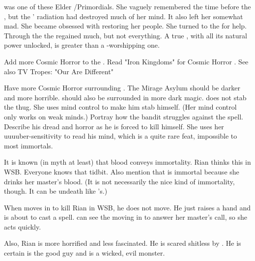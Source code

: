\Xserasshana was one of these Elder \Dragons/Primordials. 
She vaguely remembered the time before the \firstbanewar, but the \banes' radiation had destroyed much of her mind.
It also left her somewhat mad.
She became obsessed with restoring her people.
She turned to the \xss for help.
Through the \xss the \dragons regained much, but not everything.
A true \dragon, with all its natural power unlocked, is greater than a \xs-worshipping one.

Add more Cosmic Horror to the \dragons.
Read "Iron Kingdoms" for Cosmic Horror \dragons.
See also TV Tropes: "Our \Dragons Are Different"

Have more Cosmic Horror surrounding \Ishnaruchaefir.
The Mirage Asylum should be darker and more horrible.
\Criseis should also be surrounded in more dark magic.
\Criseis does not stab the thug.
She uses mind control to make him stab himself.
(Her mind control only works on weak minds.)
Portray how the bandit struggles against the spell.
Describe his dread and horror as he is forced to kill himself.
She uses her uuuuber-sensitivity to read his mind, which is a quite rare feat, impossible to most immortals.

It is known (in myth at least) that \draconian blood conveys immortality.
Rian thinks this in WSB.
Everyone knows that tidbit.
Also mention that \Criseis is immortal because she drinks her master's blood. 
(It is not necessarily the nice kind of immortality, though. It can be undeath like \Psyrex's.)

When \Ishnaruchaefir moves in to kill Rian in WSB, he does not move.
He just raises a hand and is about to cast a spell.
\Criseis can see the \daemons moving in to answer her master's call, so she acts quickly.

Also, Rian is more horrified and less fascinated.
He is scared shitless by \Ishnaruchaefir.
He is certain \Teshrial is the good guy and \Ishnaruchaefir is a wicked, evil monster.

